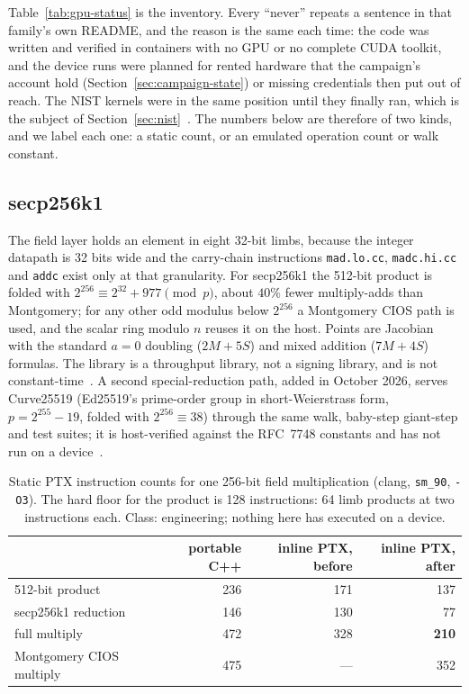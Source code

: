 Table~\ref{tab:gpu-status} is the inventory. Every ``never'' repeats a
sentence in that family's own README, and the reason is the same each
time: the code was written and verified in containers with no GPU or
no complete CUDA toolkit, and the device runs were planned for rented
hardware that the campaign's account hold
(Section~\ref{sec:campaign-state}) or missing credentials then put out
of reach. The NIST kernels were in the same position until they
finally ran, which is the subject of Section~\ref{sec:nist}~.
The numbers below are therefore of two kinds, and we label each one: a
static count, or an emulated operation count or walk constant.

\subsection{secp256k1}
\label{sec:othergpu-fp256}

The field layer holds an element in eight 32-bit limbs, because the
integer datapath is 32 bits wide and the carry-chain instructions
\texttt{mad.lo.cc}, \texttt{madc.hi.cc} and \texttt{addc} exist only at
that granularity. For secp256k1 the 512-bit product is folded with
$2^{256}\equiv2^{32}+977 \pmod p$, about $40\%$ fewer multiply-adds
than Montgomery; for any other odd modulus below $2^{256}$ a
Montgomery CIOS path is used, and the scalar ring modulo $n$ reuses
it on the host. Points are Jacobian with the standard $a=0$ doubling
($2M+5S$) and mixed addition ($7M+4S$) formulas. The library is a
throughput library, not a signing library, and is not
constant-time~.
A second special-reduction path, added in October 2026, serves
Curve25519 (Ed25519's prime-order group in short-Weierstrass form,
$p=2^{255}-19$, folded with $2^{256}\equiv38$) through the same
walk, baby-step giant-step and test suites; it is host-verified
against the RFC~7748 constants and has not run on a
device~.

\begin{table}[t]
\centering
\small
\caption{Static PTX instruction counts for one 256-bit field
  multiplication (clang, \texttt{sm\_90}, \texttt{-O3}). The hard floor
  for the product is 128 instructions: 64 limb products at two
  instructions each. Class: engineering; nothing here has executed on
  a device.}
\label{tab:fp256}
\begin{tabular}{@{}lrrr@{}}
\toprule
 & portable C++ & inline PTX, before & inline PTX, after \\
\midrule
512-bit product & 236 & 171 & 137 \\
secp256k1 reduction & 146 & 130 & 77 \\
full multiply & 472 & 328 & \textbf{210} \\
\midrule
Montgomery CIOS multiply & 475 & --- & 352 \\
\bottomrule
\end{tabular}
\end{table}

